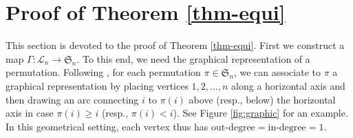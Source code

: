 \documentclass[12pt]{article}
\numberwithin{equation}{section}
\theoremstyle{plain}
\begin{document}
    	 \section{Proof of Theorem \ref{thm-equi}}
    	 This section is devoted to the proof of Theorem \ref{thm-equi}. 
    	First we construct a map $\Gamma:\mathcal{L}_n\rightarrow \mathfrak{S}_n$. 
    	To this end, we need the graphical representation of  a permutation. Following  \cite{Corteel2007}, 
    	for each permutation $\pi\in\mathfrak{S}_n$, we can associate to  $\pi$ a graphical representation by placing vertices $1,2,\dots,n$ along a horizontal axis  and then drawing an arc  connecting  $i$ to $\pi(i)$ above (resp.,  below) the horizontal axis in case $\pi(i)\geq i$ (resp., $\pi(i)<i$).  See Figure \ref{fig:graphic} for an example. In this geometrical setting,  each vertex thus has  $\text{out-degree}=\text{in-degree}=1$.
\end{document}
